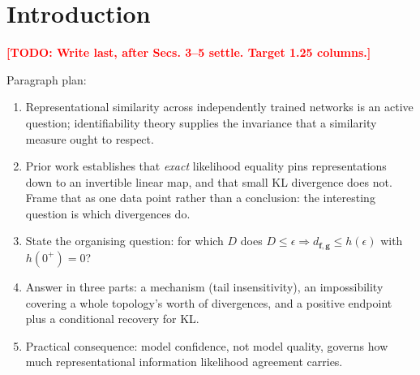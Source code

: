 \documentclass{article}
\newcommand{\TODO}[1]{\textcolor{red}{\textbf{[TODO: #1]}}}
\newcommand{\bff}{\mathbf{f}}
\newcommand{\bfg}{\mathbf{g}}
\newcommand{\dfg}{d_{\bff,\bfg}}
\theoremstyle{plain}
\theoremstyle{definition}
\theoremstyle{remark}
\begin{document}
\section{Introduction}
\label{sec:intro}

\TODO{Write last, after Secs. 3--5 settle. Target 1.25 columns.}

Paragraph plan:
\begin{enumerate}
  \item Representational similarity across independently trained networks is an
        active question; identifiability theory supplies the invariance that a
        similarity measure ought to respect.
  \item Prior work establishes that \emph{exact} likelihood equality pins
        representations down to an invertible linear map, and that small KL
        divergence does not. Frame that as one data point rather than a
        conclusion: the interesting question is which divergences do.
  \item State the organising question: for which $D$ does
        $D \le \epsilon \Rightarrow \dfg \le h(\epsilon)$ with $h(0^{+})=0$?
  \item Answer in three parts: a mechanism (tail insensitivity), an
        impossibility covering a whole topology's worth of divergences, and a
        positive endpoint plus a conditional recovery for KL.
  \item Practical consequence: model confidence, not model quality, governs how
        much representational information likelihood agreement carries.
\end{enumerate}
\end{document}
